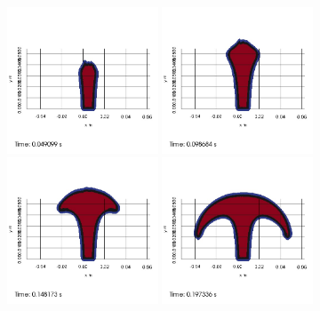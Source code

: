 \begin{figure}
\begin{center}
\subcaptionbox{\label{top:jet:P:1}}
{
\includegraphics[width=0.4\textwidth]{topology/JetPetit/topo0000.jpg}
}
\subcaptionbox{\label{top:jet:P:2}}
{
\includegraphics[width=0.4\textwidth]{topology/JetPetit/topo0001.jpg}
}
\subcaptionbox{\label{top:jet:P:3}}
{
\includegraphics[width=0.4\textwidth]{topology/JetPetit/topo0002.jpg}
}
\subcaptionbox{\label{top:jet:P:4}}
{
\includegraphics[width=0.4\textwidth]{topology/JetPetit/topo0003.jpg}
}
\end{center}
\end{figure}
